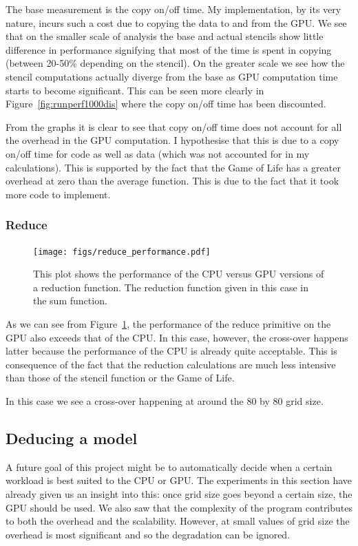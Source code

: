 \documentclass[12pt,a4paper,twoside]{scrbook}
\begin{document}
The base measurement is the copy on/off time. My implementation, by its very
nature, incurs such a cost due to copying the data to and from the GPU. We see
that on the smaller scale of analysis the base and actual stencils show little
difference in performance signifying that most of the time is spent in copying
(between 20-50\% depending on the stencil). On the greater scale we see how the
stencil computations actually diverge from the base as GPU computation time
starts to become significant. This can be seen more clearly in
Figure~\ref{fig:runperf1000dis} where the copy on/off time has been discounted.

From the graphs it is clear to see that copy on/off time does not account for
all the overhead in the GPU computation. I hypothesise that this is due to a
copy on/off time for code as well as data (which was not accounted for in my
calculations). This is supported by the fact that the Game of Life has a greater
overhead at zero than the average function. This is due to the fact that it took
more code to implement.

\subsubsection{Reduce}

\begin{figure}[h]
  \texttt{[image: figs/reduce\_performance.pdf]}
  \caption{This plot shows the performance of the CPU versus GPU versions of a
    reduction function. The reduction function given in this case in the sum
    function.}
  \label{fig:reduceperf}
\end{figure}

As we can see from Figure~\ref{fig:reduceperf}, the performance of the reduce
primitive on the GPU also exceeds that of the CPU. In this case, however, the
cross-over happens latter because the performance of the CPU is already quite
acceptable. This is consequence of the fact that the reduction calculations are
much less intensive than those of the stencil function or the Game of Life.

In this case we see a cross-over happening at around the 80 by 80 grid size.

\subsection{Deducing a model}

A future goal of this project might be to automatically decide when a certain
workload is best suited to the CPU or GPU. The experiments in this section have
already given us an insight into this: once grid size goes beyond a certain
size, the GPU should be used. We also saw that the complexity of the program
contributes to both the overhead and the scalability. However, at small values
of grid size the overhead is most significant and so the degradation can be
ignored.
\end{document}
